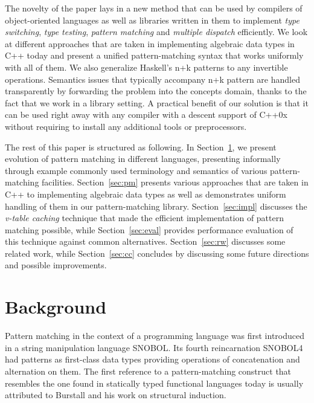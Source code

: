 \documentclass[preprint]{sigplanconf}
\begin{document}
The novelty of the paper lays in a new method that can be used by compilers of 
object-oriented languages as well as libraries written in them to implement 
\emph{type switching}, \emph{type testing}, \emph{pattern matching} and 
\emph{multiple dispatch} efficiently. We look at different approaches that are 
taken in implementing algebraic data types in C++ today and present a unified 
pattern-matching syntax that works uniformly with all of them. We also 
generalize Haskell's n+k patterns to any invertible operations. Semantics issues 
that typically accompany n+k pattern are handled transparently by forwarding the 
problem into the concepts domain, thanks to the fact that we work in a library 
setting. A practical benefit of our solution is that it can be used right away 
with any compiler with a descent support of C++0x without requiring to install 
any additional tools or preprocessors.

The rest of this paper is structured as following. In Section~\ref{sec:bg}, we 
present evolution of pattern matching in different languages, presenting 
informally through example commonly used terminology and semantics of various 
pattern-matching facilities. Section~\ref{sec:pm} presents various approaches 
that are taken in C++ to implementing algebraic data types as well as 
demonstrates uniform handling of them in our pattern-matching library. 
Section~\ref{sec:impl} discusses the \emph{v-table caching} technique that made 
the efficient implementation of pattern matching possible, while 
Section~\ref{sec:eval} provides performance evaluation of this technique against 
common alternatives. Section~\ref{sec:rw} discusses some related work, while 
Section~\ref{sec:cc} concludes by discussing some future directions and possible 
improvements.

\section{Background} %
\label{sec:bg}


Pattern matching in the context of a programming language was first introduced 
in a string manipulation language SNOBOL\cite{SNOBOL64}. Its fourth 
reincarnation SNOBOL4 had patterns as first-class data types providing 
operations of concatenation and alternation on them\cite{SNOBOL71}. The first 
reference to a pattern-matching construct that resembles the one found in 
statically typed functional languages today is usually attributed to Burstall 
and his work on structural induction\cite{Burstall69provingproperties}.
\end{document}
